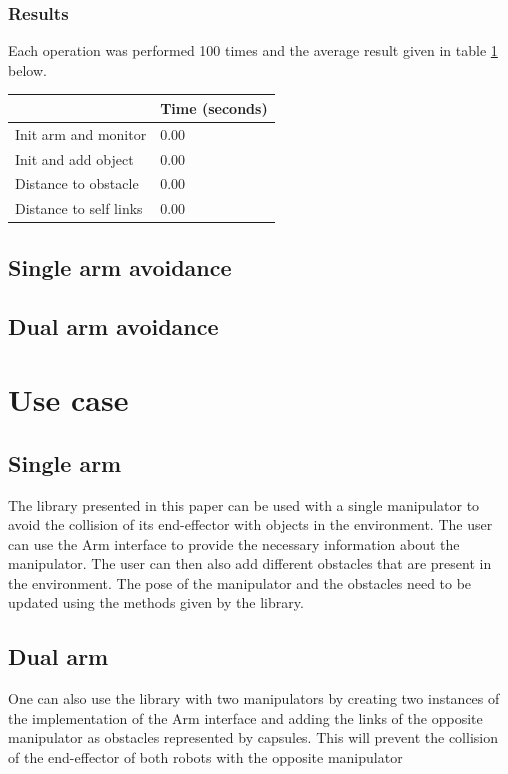 \documentclass[a4paper, 10pt, conference]{ieeeconf}      %
\begin{document}
\subsubsection{Results}
Each operation was performed 100 times and the average result given in table \ref{table:Function Times} below.

\begin{table}[]
	\centering
	\begin{tabular}{|l|l|}
		\hline
		& Time (seconds) \\ \hline
		Init arm and monitor   & 0.00           \\ \hline
		Init and add object    & 0.00           \\ \hline
		Distance to obstacle   & 0.00           \\ \hline
		Distance to self links & 0.00           \\ \hline
	\end{tabular}
	\label{table:Function Times}
\end{table}




\subsection{Single arm avoidance} %

\subsection{Dual arm avoidance} %


\section{Use case}

\subsection{Single arm} %
The library presented in this paper can be used with a single manipulator to avoid the collision of its end-effector with objects in the environment.
The user can use the Arm interface to provide the necessary information about the manipulator.
The user can then also add different obstacles that are present in the environment.
The pose of the manipulator and the obstacles need to be updated using the methods given by the library.
\subsection{Dual arm} %
One can also use the library with two manipulators by creating two instances of the implementation of the Arm interface and adding the links of 
the opposite manipulator as obstacles represented by capsules.
This will prevent the collision of the end-effector of both robots with the opposite manipulator
\end{document}
